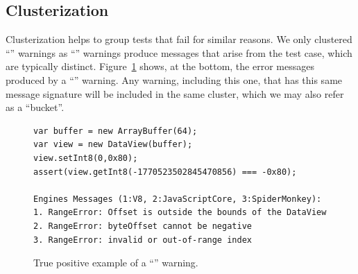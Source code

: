 \documentclass[10pt,conference,anonymous]{IEEEtran}
\begin{document}


\subsection{Clusterization}

Clusterization helps to group tests that fail for similar reasons. We
only clustered ``\lo'' warnings as ``\hi'' warnings produce messages
that arise from the test case, which are typically
distinct. Figure~\ref{fig:lo-truepositive} shows, at the bottom, the
error messages produced by a ``\lo'' warning. Any warning, including
this one, that has this same message signature will be included in the
same cluster, which we may also refer as a ``bucket''.

\begin{figure}[!h]
  \centering
  \begin{lstlisting}
var buffer = new ArrayBuffer(64);
var view = new DataView(buffer);
view.setInt8(0,0x80);
assert(view.getInt8(-1770523502845470856) === -0x80);

Engines Messages (1:V8, 2:JavaScriptCore, 3:SpiderMonkey):
1. RangeError: Offset is outside the bounds of the DataView
2. RangeError: byteOffset cannot be negative
3. RangeError: invalid or out-of-range index
  \end{lstlisting}
  \caption{\label{fig:lo-truepositive}True positive example of a ``\lo''
    warning.}
\end{figure}
\end{document}

